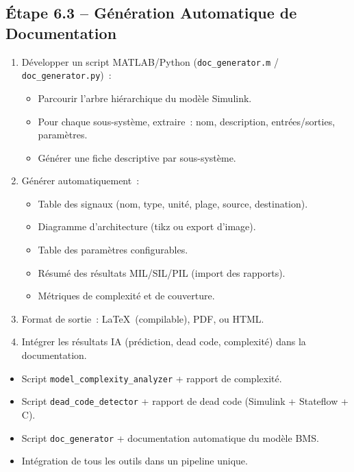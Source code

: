 \documentclass[a4paper,12pt]{article}
\begin{document}
\subsection{Étape 6.3 -- Génération Automatique de Documentation}
\begin{enumerate}[nosep]
  \item Développer un script MATLAB/Python (\texttt{doc\_generator.m} / \texttt{doc\_generator.py})~:
    \begin{itemize}[nosep]
      \item Parcourir l'arbre hiérarchique du modèle Simulink.
      \item Pour chaque sous-système, extraire~: nom, description, entrées/sorties, paramètres.
      \item Générer une fiche descriptive par sous-système.
    \end{itemize}
  \item Générer automatiquement~:
    \begin{itemize}[nosep]
      \item Table des signaux (nom, type, unité, plage, source, destination).
      \item Diagramme d'architecture (tikz ou export d'image).
      \item Table des paramètres configurables.
      \item Résumé des résultats MIL/SIL/PIL (import des rapports).
      \item Métriques de complexité et de couverture.
    \end{itemize}
  \item Format de sortie~: \LaTeX\ (compilable), PDF, ou HTML.
  \item Intégrer les résultats IA (prédiction, dead code, complexité) dans la documentation.
\end{enumerate}

\begin{deliverablebox}
\begin{itemize}[nosep]
  \item Script \texttt{model\_complexity\_analyzer} + rapport de complexité.
  \item Script \texttt{dead\_code\_detector} + rapport de dead code (Simulink + Stateflow + C).
  \item Script \texttt{doc\_generator} + documentation automatique du modèle BMS.
  \item Intégration de tous les outils dans un pipeline unique.
\end{itemize}
\end{deliverablebox}
\end{document}
